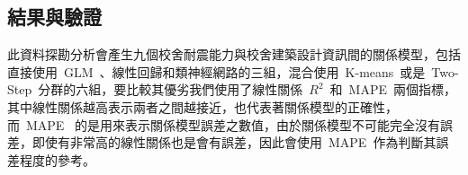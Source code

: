 


\subsection{結果與驗證}

此資料探勘分析會產生九個校舍耐震能力與校舍建築設計資訊間的關係模型，包括直接使用~GLM~、線性回歸和類神經網路的三組，混合使用~K-means~或是~Two-Step~分群的六組，要比較其優劣我們使用了線性關係~$R^2$~和~MAPE~兩個指標，其中線性關係越高表示兩者之間越接近，也代表著關係模型的正確性，而~MAPE~ 的是用來表示關係模型誤差之數值，由於關係模型不可能完全沒有誤差，即使有非常高的線性關係也是會有誤差，因此會使用~MAPE~作為判斷其誤差程度的參考。



